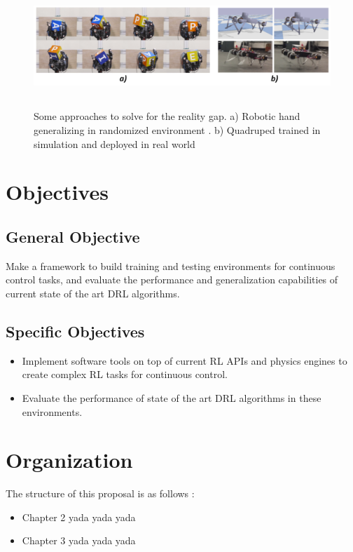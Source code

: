 \begin{figure}[!ht]
	\centering
	\includegraphics[width=6.0in,height=1.8in]{./chapters/imgs/img_reality_gap_approaches.png}
	\caption[Reality gap approaches]{Some approaches to solve for the reality gap. 
		a) Robotic hand generalizing in randomized environment \citep{dexterity-openai}.
		b) Quadruped trained in simulation and deployed in real world \citep{simtoreal-quadruped} }
	\label{fig:reality-gap-approaches}
\end{figure}

\section{Objectives}
\label{sec:objectives}

\subsection*{General Objective}
Make a framework to build training and testing environments for continuous control tasks, and 
evaluate the performance and generalization capabilities of current state of the art DRL algorithms.

\subsection*{Specific Objectives}
\begin{itemize}
 \item Implement software tools on top of current RL APIs and physics engines 
       to create complex RL tasks for continuous control.
 \item Evaluate the performance of state of the art DRL algorithms in these environments.
\end{itemize}

\section{Organization}
\label{sec:organization}

The structure of this proposal is as follows :

\begin{itemize}
	\item Chapter 2 yada yada yada
	\item Chapter 3 yada yada yada
\end{itemize}